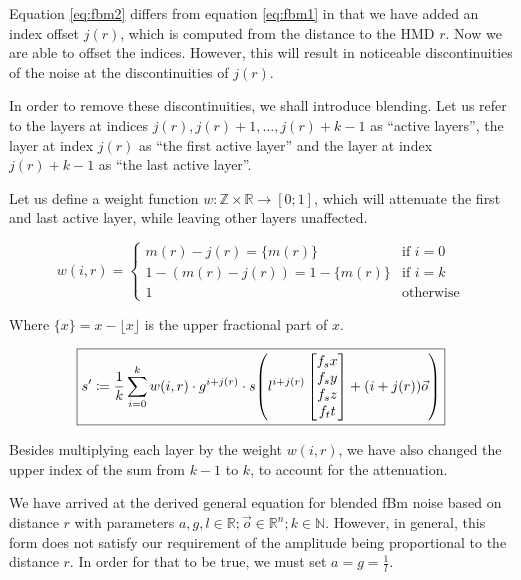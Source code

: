Equation \ref{eq:fbm2} differs from equation \ref{eq:fbm1} in that we have added an index offset $j(r)$, which is computed from the distance to the \ac{HMD} $r$. Now we are able to offset the indices. However, this will result in noticeable discontinuities of the noise at the discontinuities of $j(r)$.

In order to remove these discontinuities, we shall introduce blending. Let us refer to the layers at indices $j(r), j(r) + 1, \dots, j(r) + k - 1$ as ``active layers'', the layer at index $j(r)$ as ``the first active layer'' and the layer at index $j(r) + k - 1$ as ``the last active layer''.

Let us define a weight function $w \colon \mathbb{Z} \times \mathbb{R} \to [0; 1]$, which will attenuate the first and last active layer, while leaving other layers unaffected.

\begin{equation}
    w(i, r) =
    \begin{cases}
        m(r) - j(r) = \{m(r)\} & \text{if } i = 0 \\
        1 - (m(r) - j(r)) = 1 - \{m(r)\} & \text{if } i = k \\
        1 & \text{otherwise}
    \end{cases}
\end{equation}

Where $\{ x \} = x - \lfloor x \rfloor$ is the upper fractional part of $x$.

\begin{equation}\label{eq:fbm3}
    \boxed{
        s' \coloneqq \frac{1}{k} \sum_{i=0}^{k} w(i, r) \cdot g^{i+j(r)} \cdot s\mleft(l^{i+j(r)} \begin{bmatrix}f_sx\\f_sy\\f_sz\\f_tt\end{bmatrix} + (i + j(r)) \vec{o}\mright)
    }
\end{equation}

Besides multiplying each layer by the weight $w(i, r)$, we have also changed the upper index of the sum from $k - 1$ to $k$, to account for the attenuation.

We have arrived at the derived general equation for blended \ac{fBm} noise based on distance $r$ with parameters $a, g, l \in \mathbb{R}; \vec{o} \in \mathbb{R}^n; k \in \mathbb{N}$. However, in general, this form does not satisfy our requirement of the amplitude being proportional to the distance $r$. In order for that to be true, we must set $a = g = \frac{1}{l}$.

